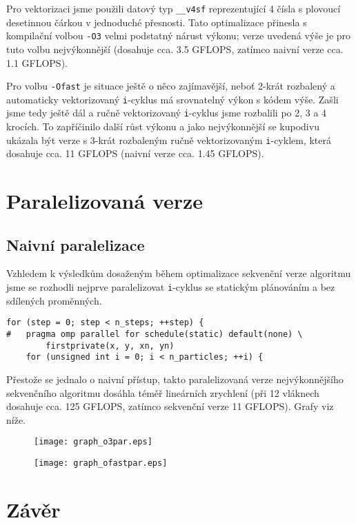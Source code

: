 \documentclass[10pt,a4paper]{article}
\begin{document}
Pro vektorizaci jsme použili datový typ \texttt{\_\_v4sf} reprezentující
4 čísla s plovoucí desetinnou čárkou v jednoduché přesnosti. Tato optimalizace
přinesla s kompilační volbou \texttt{-O3} velmi podstatný nárust výkonu; verze
uvedená výše je pro tuto volbu nejvýkonnější (dosahuje cca. 3.5 GFLOPS, zatímco
naivní verze cca. 1.1 GFLOPS).

Pro volbu \texttt{-Ofast} je situace ještě o něco zajímavější, neboť
2-krát rozbalený a automaticky vektorizovaný \texttt{i}-cyklus má
srovnatelný výkon s kódem výše. Zašli jsme tedy ještě dál a ručně
vektorizovaný \texttt{i}-cyklus jsme rozbalili po 2, 3 a 4 krocích. To
zapříčinilo další růst výkonu a jako nejvýkonnější se kupodivu ukázala
být verze s 3-krát rozbaleným ručně vektorizovaným \texttt{i}-cyklem,
která dosahuje cca. 11 GFLOPS (naivní verze cca. 1.45 GFLOPS).

\vspace{10pt}
\section{Paralelizovaná verze}

\subsection{Naivní paralelizace}
Vzhledem k výsledkům dosaženým během optimalizace sekvenční verze
algoritmu jsme se rozhodli nejprve paralelizovat \texttt{i}-cyklus
se statickým plánováním a bez sdílených proměnných.

\begin{lstlisting}
for (step = 0; step < n_steps; ++step) {
#   pragma omp parallel for schedule(static) default(none) \
        firstprivate(x, y, xn, yn)
    for (unsigned int i = 0; i < n_particles; ++i) {
\end{lstlisting}

Přestože se jednalo o naivní přístup, takto paralelizovaná verze nejvýkonnějšího
sekvenčního algoritmu dosáhla téměř lineárních zrychlení (při 12 vláknech dosahuje
cca. 125 GFLOPS, zatímco sekvenční verze 11 GFLOPS). Grafy viz níže.

\begin{figure}[h]
    \centering
    \texttt{[image: graph\_o3par.eps]}
    \label{fig:1}
\end{figure}

\begin{figure}[h]
    \centering
    \texttt{[image: graph\_ofastpar.eps]}
    \label{fig:2}
\end{figure}

\section{Závěr}
\end{document}
